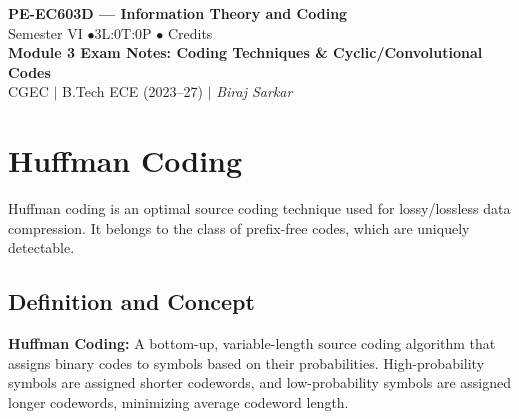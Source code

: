 \documentclass[12pt,a4paper]{article}
\begin{document}

\begin{center}
  {\LARGE\bfseries\color{myred} PE-EC603D --- Information Theory and Coding}\\[5pt]
  {\normalsize\color{mydark} Semester VI \quad$\bullet$\quad 3L:0T:0P \quad$\bullet$ Credits}\\[3pt]
  {\normalsize\color{myteal}\textbf{Module 3 Exam Notes: Coding Techniques \& Cyclic/Convolutional Codes}}\\[3pt]
  {\small\color{mydark} CGEC \;$|$\; B.Tech ECE (2023--27) \;$|$\; \textit{Biraj Sarkar}}
\end{center}
\vspace{2pt}
\noindent{\color{myred}\rule{\linewidth}{1.5pt}}
\vspace{2pt}

\hypersetup{linkcolor=mydark}
\tableofcontents
\hypersetup{linkcolor=myteal}
\newpage

\section{Huffman Coding}

Huffman coding is an optimal source coding technique used for lossy/lossless data compression. It belongs to the class of prefix-free codes, which are uniquely detectable.

\subsection{Definition and Concept}
\begin{tcolorbox}[defbox]
\textbf{Huffman Coding:} A bottom-up, variable-length source coding algorithm that assigns binary codes to symbols based on their probabilities. High-probability symbols are assigned shorter codewords, and low-probability symbols are assigned longer codewords, minimizing average codeword length.
\end{tcolorbox}
\end{document}
